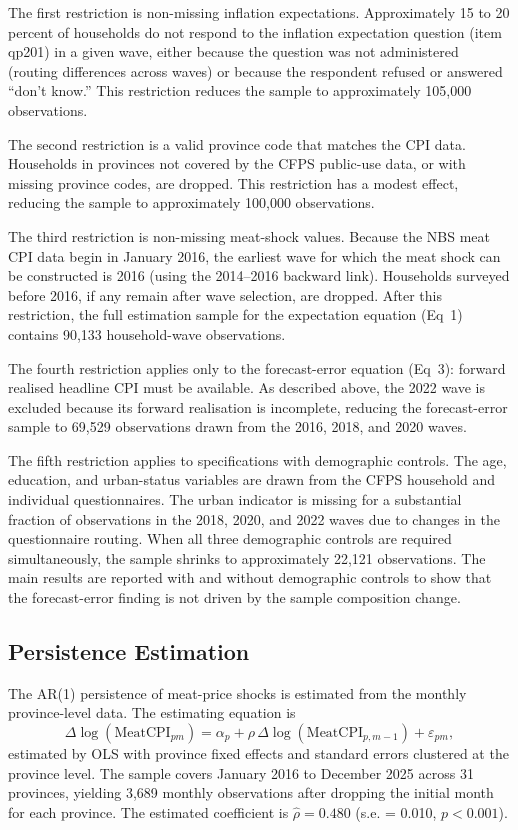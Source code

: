 The first restriction is non-missing inflation expectations.
Approximately 15 to 20 percent of households do not respond
to the inflation expectation question (item qp201) in a given
wave, either because the question was not administered
(routing differences across waves) or because the respondent
refused or answered ``don't know.''
This restriction reduces the sample to approximately 105,000
observations.

The second restriction is a valid province code that matches
the CPI data.
Households in provinces not covered by the CFPS public-use
data, or with missing province codes, are dropped.
This restriction has a modest effect, reducing the sample to
approximately 100,000 observations.

The third restriction is non-missing meat-shock values.
Because the NBS meat CPI data begin in January 2016, the
earliest wave for which the meat shock can be constructed is
2016 (using the 2014--2016 backward link).
Households surveyed before 2016, if any remain after wave
selection, are dropped.
After this restriction, the full estimation sample for the
expectation equation (Eq~1) contains 90,133 household-wave
observations.

The fourth restriction applies only to the forecast-error
equation (Eq~3): forward realised headline CPI must be
available.
As described above, the 2022 wave is excluded because its
forward realisation is incomplete, reducing the
forecast-error sample to 69,529 observations drawn from
the 2016, 2018, and 2020 waves.

The fifth restriction applies to specifications with
demographic controls.
The age, education, and urban-status variables are drawn from
the CFPS household and individual questionnaires.
The urban indicator is missing for a substantial fraction of
observations in the 2018, 2020, and 2022 waves due to
changes in the questionnaire routing.
When all three demographic controls are required
simultaneously, the sample shrinks to approximately 22,121
observations.
The main results are reported with and without demographic
controls to show that the forecast-error finding is not
driven by the sample composition change.

\subsection{Persistence Estimation}

The AR(1) persistence of meat-price shocks is estimated from
the monthly province-level data.
The estimating equation is
\[
  \Delta\log(\mathrm{MeatCPI}_{pm})
  = \alpha_p
  + \rho\,\Delta\log(\mathrm{MeatCPI}_{p,m-1})
  + \varepsilon_{pm},
\]
estimated by OLS with province fixed effects and standard
errors clustered at the province level.
The sample covers January 2016 to December 2025 across 31
provinces, yielding 3,689 monthly observations after
dropping the initial month for each province.
The estimated coefficient is $\hat{\rho} = 0.480$
(s.e. = 0.010, $p < 0.001$).

